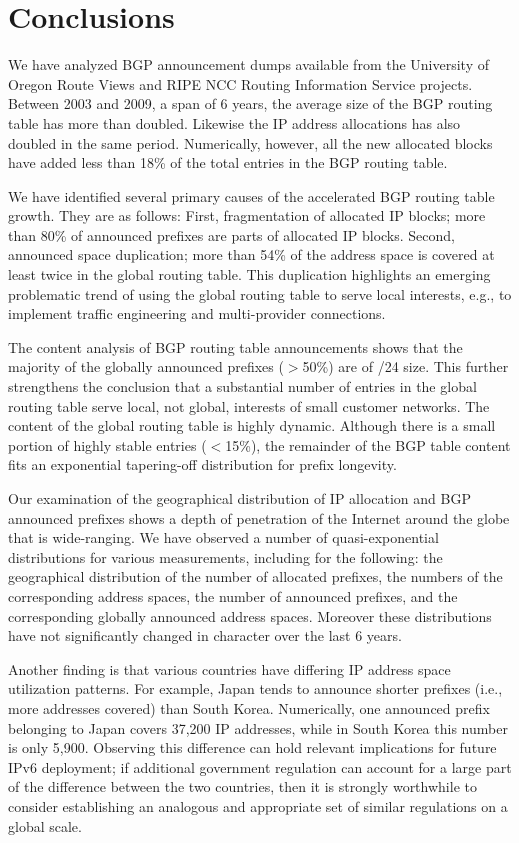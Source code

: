 \section{Conclusions}
\label{sec:conclusions}

We have analyzed BGP announcement dumps available from the University of Oregon
Route Views and RIPE NCC Routing Information Service projects. Between 2003 and
2009, a span of 6 years, the average size of the BGP routing table has more
than doubled. Likewise the IP address allocations has also doubled in the same
period. Numerically, however, all the new allocated blocks have added less than
18\% of the total entries in the BGP routing table.

We have identified several primary causes of the accelerated BGP routing table
growth.  They are as follows: First, fragmentation of allocated IP blocks; more
than 80\% of announced prefixes are parts of allocated IP blocks. Second,
announced space duplication; more than 54\% of the address space is covered at
least twice in the global routing table. This duplication highlights an
emerging problematic trend of using the global routing table to serve local
interests, e.g., to implement traffic engineering and multi-provider
connections.

The content analysis of BGP routing table announcements shows that the majority
of the globally announced prefixes ($>$50\%) are of /24 size. This further
strengthens the conclusion that a substantial number of entries in the global
routing table serve local, not global, interests of small customer networks.
The content of the global routing table is highly dynamic. Although there is a
small portion of highly stable entries ($<$15\%), the remainder of the BGP
table content fits an exponential tapering-off distribution for prefix
longevity.

Our examination of the geographical distribution of IP allocation and BGP
announced prefixes shows a depth of penetration of the Internet around the
globe that is wide-ranging. We have observed a number of quasi-exponential
distributions for various measurements, including for the following: the
geographical distribution of the number of allocated prefixes, the numbers of
the corresponding address spaces, the number of announced prefixes, and the
corresponding globally announced address spaces. Moreover these distributions
have not significantly changed in character over the last 6 years.

Another finding is that various countries have differing IP address space
utilization patterns. For example, Japan tends to announce shorter prefixes
(i.e., more addresses covered) than South Korea. Numerically, one announced
prefix belonging to Japan covers 37,200 IP addresses, while in South Korea this
number is only 5,900. Observing this difference can hold relevant implications
for future IPv6 deployment; if additional government regulation can account for
a large part of the difference between the two countries, then it is strongly
worthwhile to consider establishing an analogous and appropriate set of similar
regulations on a global scale.
